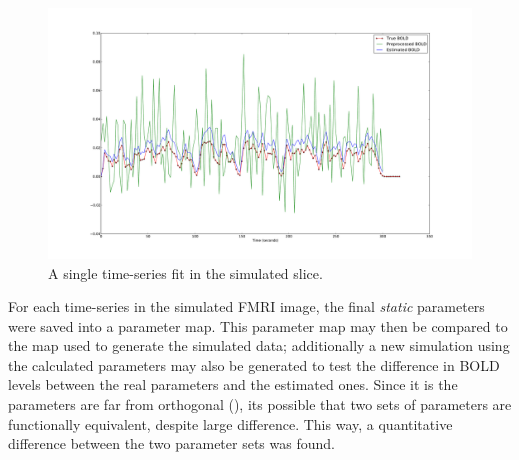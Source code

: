 \begin{figure}[H]
\centering
\includegraphics[width=15cm]{images/simslice_noise}
\caption{A single time-series fit in the simulated slice.}
\label{fig:simslicefit1}
\end{figure}

For each time-series in the simulated FMRI image, the final \emph{static} parameters were saved
into a parameter map. This parameter map may then be compared to the map used to generate the 
simulated data; additionally a new simulation using the calculated parameters may also be 
generated to test the difference in BOLD levels between the real parameters and the
estimated ones. Since it is the parameters are far from orthogonal 
(\cite{Deneux2006}), its possible that two sets of parameters are functionally equivalent,
despite large difference. This way, a quantitative difference between the two parameter sets 
was found.

